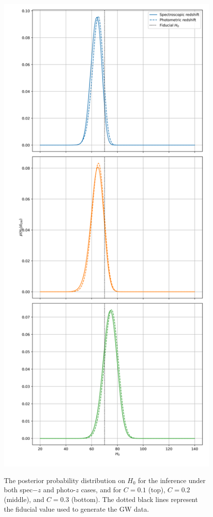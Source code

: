 \documentclass[%
preprint,
nofootinbib,
 amsmath,amssymb,
 aps,
]{revtex4-2}
\begin{document}
\begin{figure}[!htpb]
	\caption{The posterior probability distribution on $H_0$ for the inference under both spec$-z$ and photo-$z$ cases,
		and for $C=0.1$ (top), $C=0.2$ (middle), and $C=0.3$ (bottom). The dotted black lines represent the fiducial value used to generate the GW data.}
	\centering
	\includegraphics[height=0.9\textheight]{../src/figures/posterior-comparison.png}
	\label{fig:posterior-comparison}
\end{figure}
\end{document}
